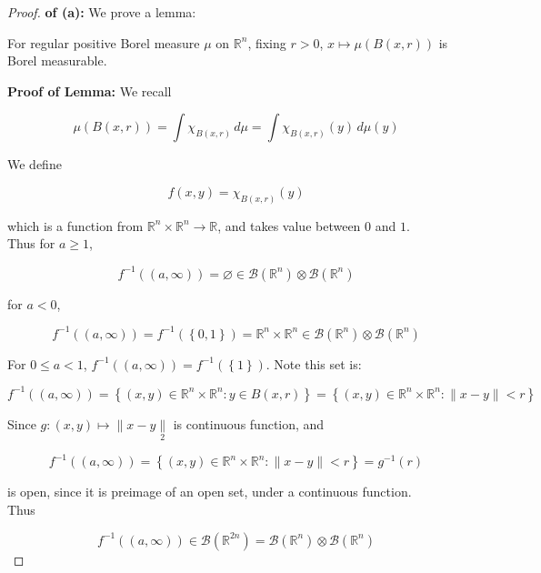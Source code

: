 \documentclass{qlnotes-export}
\begin{document}
\begin{proof}

\textbf{of (a):} We prove a lemma:

\begin{lemma}\label{lem-hw11-on-regular-borel-measure-bv-lemma-001}

For regular positive Borel measure \(\mu\) on \({\mathbb{R}}^{n}\), fixing \(r > 0\), \(x\mapsto\mu(B(x,r))\) is Borel measurable.

\end{lemma}

\textbf{Proof of Lemma:} We recall

\[\mu(B(x,r)) = \int\chi_{B(x,r)}\, d\mu = \int\chi_{B(x,r)}(y)\, d\mu(y)\]

We define

\[f(x,y) = \chi_{B(x,r)}(y)\]

which is a function from \({\mathbb{R}}^{n} \times {\mathbb{R}}^{n}\rightarrow{\mathbb{R}}\), and takes value between \(0\) and \(1\).\\
Thus for \(a \geq 1\),

\[f^{- 1}((a,\infty)) = \varnothing \in \mathcal{B}({\mathbb{R}}^{n}) \otimes \mathcal{B}({\mathbb{R}}^{n})\]

for \(a < 0\),

\[f^{- 1}((a,\infty)) = f^{- 1}(\left\{ {0,1} \right\}) = {\mathbb{R}}^{n} \times {\mathbb{R}}^{n} \in \mathcal{B}({\mathbb{R}}^{n}) \otimes \mathcal{B}({\mathbb{R}}^{n})\]

For \(0 \leq a < 1\), \(f^{- 1}((a,\infty)) = f^{- 1}(\left\{ 1 \right\})\). Note this set is:

\[f^{- 1}((a,\infty)) = \left\{ {(x,y) \in {\mathbb{R}}^{n} \times {\mathbb{R}}^{n}:y \in B(x,r)} \right\} = \left\{ {(x,y) \in {\mathbb{R}}^{n} \times {\mathbb{R}}^{n}: \parallel x - y \parallel < r} \right\}\]

Since \(g:(x,y)\mapsto \parallel x - y\underset{2}{\parallel}\) is continuous function, and

\[f^{- 1}((a,\infty)) = \left\{ {(x,y) \in {\mathbb{R}}^{n} \times {\mathbb{R}}^{n}: \parallel x - y \parallel < r} \right\} = g^{- 1}(r)\]

is open, since it is preimage of an open set, under a continuous function.\\
Thus

\[f^{- 1}((a,\infty)) \in \mathcal{B}({\mathbb{R}}^{2n}) = \mathcal{B}({\mathbb{R}}^{n}) \otimes \mathcal{B}({\mathbb{R}}^{n})\]


\end{proof}
\end{document}
